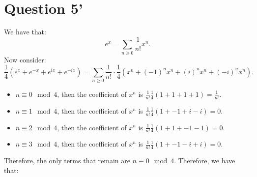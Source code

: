 \documentclass[]{article}
\begin{document}
\section{Question 5'}
We have that:
\begin{equation}
	e^x = \sum_{n \geq 0} \frac{1}{n!}x^n.
\end{equation}
Now consider:
\begin{equation}
	\frac{1}{4} \left(e^x + e^{-x} + e^{ix} + e^{-ix} \right) = \sum_{n \geq 0} \frac{1}{n!} \cdot \frac{1}{4} \left(x^n + (-1)^n x^n + (i)^n x^n + (-i)^n x^n\right).
\end{equation}
\begin{itemize}
	\item $n \equiv 0 \mod 4$, then the coefficient of $x^n$ is $\frac{1}{n!}\frac{1}{4} \left(1 + 1 + 1 + 1\right) = \frac{1}{n!}$. 
	\item $n \equiv 1 \mod 4$, then the coefficient of $x^n$ is $\frac{1}{n!}\frac{1}{4} \left(1 + -1 + i -i \right) = 0$. 
	\item $n \equiv 2 \mod 4$, then the coefficient of $x^n$ is $\frac{1}{n!}\frac{1}{4} \left(1 + 1 + -1 -1 \right) = 0$. 
	\item $n \equiv 3 \mod 4$, then the coefficient of $x^n$ is $\frac{1}{n!}\frac{1}{4} \left(1 + -1 -i + i \right) = 0$. 
\end{itemize}
Therefore, the only terms that remain are $n \equiv 0 \mod 4$. Therefore, we have that:
\end{document}
